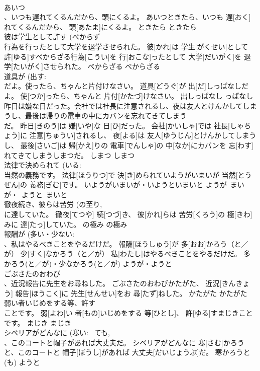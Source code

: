 \documentclass[8pt]{extreport}
\begin{document}
\begin{CJK}{UTF8}{min}
\\	あいつ 
\\	、いつも遅れてくるんだから、頭にくるよ。	あいつときたら、いつも 遅[おく]れてくるんだから、 頭[あたま]にくるよ。	ときたら	ときたら	
\\	彼は学生として許す (べからず 
\\	行為を行ったとして大学を退学させられた。	彼[かれ]は 学生[がくせい]として 許[ゆる]すべからざる行為[こうい]を 行[おこな]ったとして 大学[だいがく]を 退学[たいがく]させられた。	べからざる	べからざる	
\\	道具が (出す: 
\\	だよ。使ったら、ちゃんと片付けなさい。	道具[どうぐ]が 出[だ]しっぱなしだよ。 使[つか]ったら、ちゃんと 片付[かたづ]けなさい。	出しっぱなし	っぱなし	
\\	昨日は嫌な日だった。会社では社長に注意されるし、夜は友人とけんかしてしまうし、最後は帰りの電車の中にカバンを忘れてきてしまう 
\\	だ。	昨日[きのう]は 嫌[いや]な 日[ひ]だった。 会社[かいしゃ]では 社長[しゃちょう]に 注意[ちゅうい]されるし、 夜[よる]は 友人[ゆうじん]とけんかしてしまうし、 最後[さいご]は 帰[かえ]りの 電車[でんしゃ]の 中[なか]にカバンを 忘[わす]れてきてしまうしまつだ。	しまつ	しまつ	
\\	法律で決められて (いる: 
\\	当然の義務です。	法律[ほうりつ]で 決[き]められていようがいまいが 当然[とうぜん]の 義務[ぎむ]です。	いようがいまいが・いようといまいと	ようが~まいが・~ようと~まいと	
\\	徹夜続き、彼らは苦労 (の至り, 
\\	に達していた。	徹夜[てつや] 続[つづ]き、 彼[かれ]らは 苦労[くろう]の 極[きわ]みに 達[たっ]していた。	の極み	の極み	
\\	報酬が (多い・少ない: 
\\	、私はやるべきことをやるだけだ。	報酬[ほうしゅう]が 多[おお]かろう（と／が） 少[すく]なかろう（と／が） 私[わたし]はやるべきことをやるだけだ。	多かろう(と／が)・少なかろう(と／が)	ようが・ようと	
\\	ごぶさたのおわび 
\\	、近況報告に先生をお尋ねした。	ごぶさたのおわびかたがた、 近況[きんきょう] 報告[ほうこく]に 先生[せんせい]をお 尋[たず]ねした。	かたがた	かたがた	
\\	弱い者いじめをする等、許す 
\\	ことです。	弱[よわ]い 者[もの]いじめをする 等[ひとし]、 許[ゆる]すまじきことです。	まじき	まじき	
\\	シベリアがどんなに (寒い: ~ても, 
\\	、このコートと帽子があれば大丈夫だ。	シベリアがどんなに 寒[さむ]かろうと、このコートと 帽子[ぼうし]があれば 大丈夫[だいじょうぶ]だ。	寒かろうと(も)	ようと	
\end{CJK}
\end{document}
